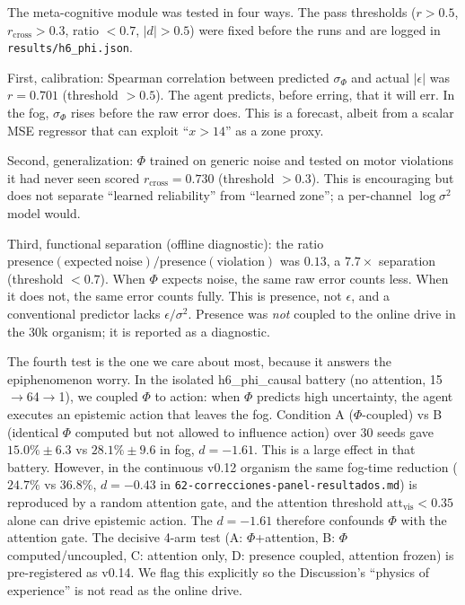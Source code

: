 \documentclass[11pt,a4paper]{article}
\begin{document}
The meta-cognitive module was tested in four ways. The pass thresholds ($r>0.5$, $r_{\mathrm{cross}}>0.3$, ratio $<0.7$, $|d|>0.5$) were fixed before the runs and are logged in \texttt{results/h6\_phi.json}.

First, calibration: Spearman correlation between predicted $\sigma_\Phi$ and actual $|\epsilon|$ was $r=0.701$ (threshold $>0.5$). The agent predicts, before erring, that it will err. In the fog, $\sigma_\Phi$ rises before the raw error does. This is a forecast, albeit from a scalar MSE regressor that can exploit ``$x>14$'' as a zone proxy.

Second, generalization: $\Phi$ trained on generic noise and tested on motor violations it had never seen scored $r_{\mathrm{cross}}=0.730$ (threshold $>0.3$). This is encouraging but does not separate ``learned reliability'' from ``learned zone''; a per-channel $\log \sigma^2$ model would.

Third, functional separation (offline diagnostic): the ratio $\mathrm{presence}(\mathrm{expected\ noise})/\mathrm{presence}(\mathrm{violation})$ was $0.13$, a $7.7\times$ separation (threshold $<0.7$). When $\Phi$ expects noise, the same raw error counts less. When it does not, the same error counts fully. This is presence, not $\epsilon$, and a conventional predictor lacks $\epsilon/\sigma^2$. Presence was \textit{not} coupled to the online drive in the 30k organism; it is reported as a diagnostic.

The fourth test is the one we care about most, because it answers the epiphenomenon worry. In the isolated h6\_phi\_causal battery (no attention, 15$\rightarrow$64$\rightarrow$1), we coupled $\Phi$ to action: when $\Phi$ predicts high uncertainty, the agent executes an epistemic action that leaves the fog. Condition A ($\Phi$-coupled) vs B (identical $\Phi$ computed but not allowed to influence action) over 30 seeds gave $15.0\%\pm6.3$ vs $28.1\%\pm9.6$ in fog, $d=-1.61$. This is a large effect in that battery. However, in the continuous v0.12 organism the same fog-time reduction ($24.7\%$ vs $36.8\%$, $d=-0.43$ in \texttt{62-correcciones-panel-resultados.md}) is reproduced by a random attention gate, and the attention threshold $\mathrm{att}_{\mathrm{vis}}<0.35$ alone can drive epistemic action. The $d=-1.61$ therefore confounds $\Phi$ with the attention gate. The decisive 4-arm test (A: $\Phi$+attention, B: $\Phi$ computed/uncoupled, C: attention only, D: presence coupled, attention frozen) is pre-registered as v0.14. We flag this explicitly so the Discussion's ``physics of experience'' is not read as the online drive.
\end{document}
